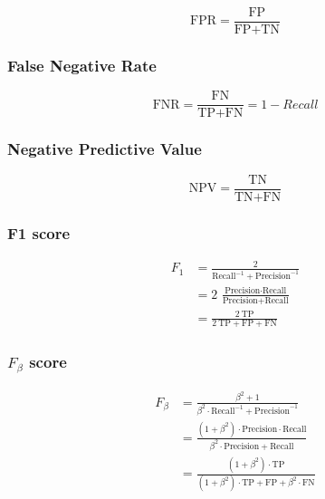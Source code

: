 \documentclass[a4paper,11pt]{article}
\begin{document}
\begin{equation}
    \textrm{FPR} = \frac{\textrm{FP}}{\textrm{FP} + \textrm{TN}}
\end{equation}

\subsubsection{False Negative Rate}\label{formula:fpr}

\begin{equation}
    \textrm{FNR} = \frac{\textrm{FN}}{\textrm{TP} + \textrm{FN}} = 1 - Recall
\end{equation}

\subsubsection{Negative Predictive Value}\label{formula:npv}

\begin{equation}
    \textrm{NPV} = \frac{\textrm{TN}}{\textrm{TN} + \textrm{FN}}
\end{equation}

\subsubsection{F1 score}\label{formula:f1}

\begin{align}
    F_1 &= \frac{2}{\textrm{Recall}^{-1} + \textrm{Precision}^{-1}}\\
    &= 2\ \frac{\textrm{Precision} \cdot \textrm{Recall}}{\textrm{Precision} + \textrm{Recall}}\\
    &= \frac{2\ \textrm{TP}}{2\ \textrm{TP} + \textrm{FP} + \textrm{FN}}
\end{align}

\subsubsection{$F_\beta$ score}\label{formula:fbeta}

\begin{align}
    F_\beta &= \frac{\beta^2 + 1}{\beta^2 \cdot \textrm{Recall}^{-1} + \textrm{Precision}^{-1}}\\
    &= \frac{(1+\beta^2)\cdot\textrm{Precision} \cdot \textrm{Recall}}{\beta^2\cdot\textrm{Precision} + \textrm{Recall}}\\
    &= \frac{(1+\beta^2)\cdot\textrm{TP}}{(1+\beta^2)\cdot\textrm{TP} + \textrm{FP} + \beta^2\cdot\textrm{FN}}
\end{align}
\end{document}
